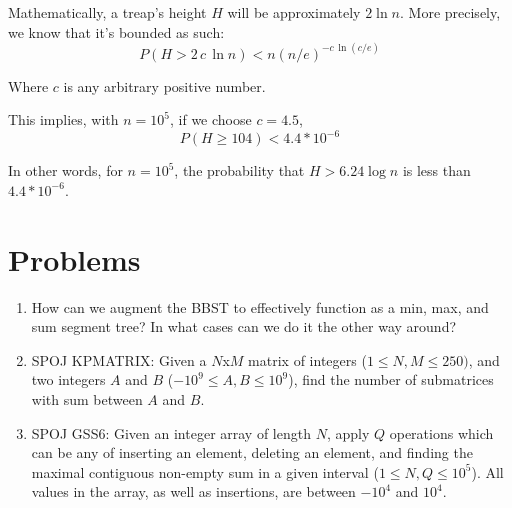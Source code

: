 \documentclass[11pt]{article}
\begin{document}
    Mathematically, a treap's height $H$ will be approximately $2 \ln n$. More precisely, we know that it's bounded as such: $$ P(H > 2\,c\,\ln n) < n (n/e)^{-c\,\ln(c/e)}$$
    
    Where $c$ is any arbitrary positive number.
    
    This implies, with $n = 10^5$, if we choose $c = 4.5$,
    $$ P(H \geq 104) < 4.4 * 10^{-6} $$
    
    In other words, for $n = 10^5$, the probability that $H > 6.24 \log n$ is less than $4.4 * 10^{-6}$.
    

\section{Problems}

\begin{enumerate}
    \item How can we augment the BBST to effectively function as a min, max, and sum segment tree? In what cases can we do it the other way around?
    
    \item SPOJ KPMATRIX: Given a $N$x$M$ matrix of integers ($1 \leq N,M \leq 250)$, and two integers $A$ and $B$ ($-10^9 \leq A, B \leq 10^9$), find the number of submatrices with sum between $A$ and $B$.
    
    \item SPOJ GSS6: Given an integer array of length $N$, apply $Q$ operations which can be any of inserting an element, deleting an element, and finding the maximal contiguous non-empty sum in a given interval ($1 \leq N, Q \leq 10^5$). All values in the array, as well as insertions, are between $-10^4$ and $10^4$.
\end{enumerate}
\end{document}
